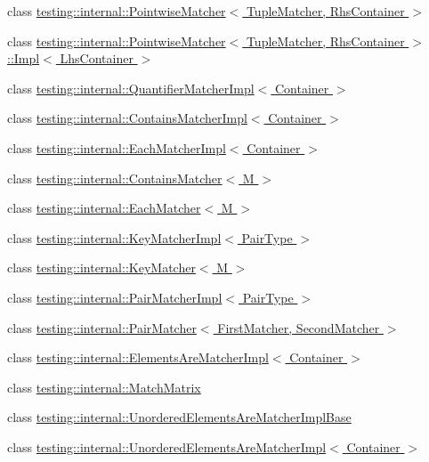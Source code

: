 \begin{DoxyCompactItemize}
\item 
class \hyperlink{classtesting_1_1internal_1_1_pointwise_matcher}{testing\+::internal\+::\+Pointwise\+Matcher$<$ Tuple\+Matcher, Rhs\+Container $>$}
\item 
class \hyperlink{classtesting_1_1internal_1_1_pointwise_matcher_1_1_impl}{testing\+::internal\+::\+Pointwise\+Matcher$<$ Tuple\+Matcher, Rhs\+Container $>$\+::\+Impl$<$ Lhs\+Container $>$}
\item 
class \hyperlink{classtesting_1_1internal_1_1_quantifier_matcher_impl}{testing\+::internal\+::\+Quantifier\+Matcher\+Impl$<$ Container $>$}
\item 
class \hyperlink{classtesting_1_1internal_1_1_contains_matcher_impl}{testing\+::internal\+::\+Contains\+Matcher\+Impl$<$ Container $>$}
\item 
class \hyperlink{classtesting_1_1internal_1_1_each_matcher_impl}{testing\+::internal\+::\+Each\+Matcher\+Impl$<$ Container $>$}
\item 
class \hyperlink{classtesting_1_1internal_1_1_contains_matcher}{testing\+::internal\+::\+Contains\+Matcher$<$ M $>$}
\item 
class \hyperlink{classtesting_1_1internal_1_1_each_matcher}{testing\+::internal\+::\+Each\+Matcher$<$ M $>$}
\item 
class \hyperlink{classtesting_1_1internal_1_1_key_matcher_impl}{testing\+::internal\+::\+Key\+Matcher\+Impl$<$ Pair\+Type $>$}
\item 
class \hyperlink{classtesting_1_1internal_1_1_key_matcher}{testing\+::internal\+::\+Key\+Matcher$<$ M $>$}
\item 
class \hyperlink{classtesting_1_1internal_1_1_pair_matcher_impl}{testing\+::internal\+::\+Pair\+Matcher\+Impl$<$ Pair\+Type $>$}
\item 
class \hyperlink{classtesting_1_1internal_1_1_pair_matcher}{testing\+::internal\+::\+Pair\+Matcher$<$ First\+Matcher, Second\+Matcher $>$}
\item 
class \hyperlink{classtesting_1_1internal_1_1_elements_are_matcher_impl}{testing\+::internal\+::\+Elements\+Are\+Matcher\+Impl$<$ Container $>$}
\item 
class \hyperlink{classtesting_1_1internal_1_1_match_matrix}{testing\+::internal\+::\+Match\+Matrix}
\item 
class \hyperlink{classtesting_1_1internal_1_1_unordered_elements_are_matcher_impl_base}{testing\+::internal\+::\+Unordered\+Elements\+Are\+Matcher\+Impl\+Base}
\item 
class \hyperlink{classtesting_1_1internal_1_1_unordered_elements_are_matcher_impl}{testing\+::internal\+::\+Unordered\+Elements\+Are\+Matcher\+Impl$<$ Container $>$}

\end{DoxyCompactItemize}
